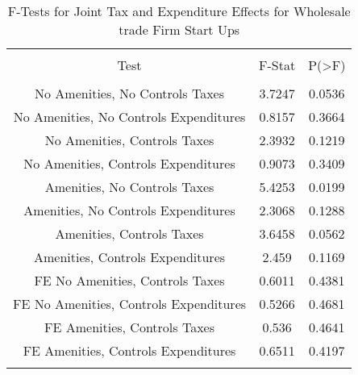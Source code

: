 
\begin{table}[!htbp] \centering 
  \caption{F-Tests for Joint Tax and Expenditure Effects for Wholesale trade Firm Start Ups} 
  \label{42Ftests} 
\begin{tabular}{@{\extracolsep{5pt}} ccc} 
\\[-1.8ex]\hline 
\hline \\[-1.8ex] 
Test & F-Stat & P(\textgreater F) \\ 
\hline \\[-1.8ex] 
No Amenities, No Controls Taxes & 3.7247 & 0.0536 \\ 
No Amenities, No Controls Expenditures & 0.8157 & 0.3664 \\ 
No Amenities, Controls Taxes & 2.3932 & 0.1219 \\ 
No Amenities, Controls Expenditures & 0.9073 & 0.3409 \\ 
Amenities, No Controls Taxes & 5.4253 & 0.0199 \\ 
Amenities, No Controls Expenditures & 2.3068 & 0.1288 \\ 
Amenities, Controls Taxes & 3.6458 & 0.0562 \\ 
Amenities, Controls Expenditures & 2.459 & 0.1169 \\ 
FE No Amenities, Controls Taxes & 0.6011 & 0.4381 \\ 
FE No Amenities, Controls Expenditures & 0.5266 & 0.4681 \\ 
FE Amenities, Controls Taxes & 0.536 & 0.4641 \\ 
FE Amenities, Controls Expenditures & 0.6511 & 0.4197 \\ 
\hline \\[-1.8ex] 
\end{tabular} 
\end{table} 
